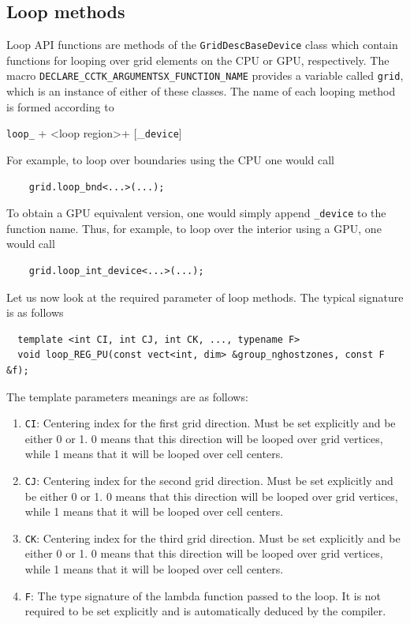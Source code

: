 
\subsection{Loop methods}
\label{sec:loop_methods}

Loop API functions are methods of the \texttt{GridDescBaseDevice} class which contain functions for looping over grid elements on the CPU or GPU, respectively. The macro \texttt{DECLARE\_CCTK\_ARGUMENTSX\_FUNCTION\_NAME} provides a variable called \texttt{grid}, which is an instance of either of these classes. The name of each looping method is formed according to
%
\begin{center}
    \texttt{loop\_} + \textless loop region\textgreater + [\_\texttt{device}]
\end{center}

For example, to loop over boundaries using the CPU one would call
%
\begin{lstlisting}
    grid.loop_bnd<...>(...);
\end{lstlisting}
%
To obtain a GPU equivalent version, one would simply append \texttt{\_device} to the function name. Thus, for example, to loop over the interior using a GPU, one would call 

\begin{lstlisting}
    grid.loop_int_device<...>(...);
\end{lstlisting}

Let us now look at the required parameter of loop methods. The typical signature is as follows

\begin{lstlisting}
  template <int CI, int CJ, int CK, ..., typename F>
  void loop_REG_PU(const vect<int, dim> &group_nghostzones, const F &f);
\end{lstlisting}

The template parameters meanings are as follows:

\begin{enumerate}
  \item \texttt{CI}: Centering index for the first grid direction. Must be set explicitly and be either 0 or 1. 0 means that this direction will be looped over grid vertices, while 1 means that it will be looped over cell centers.
  \item \texttt{CJ}: Centering index for the second grid direction. Must be set explicitly and be either 0 or 1. 0 means that this direction will be looped over grid vertices, while 1 means that it will be looped over cell centers.
  \item \texttt{CK}: Centering index for the third grid direction. Must be set explicitly and be either 0 or 1. 0 means that this direction will be looped over grid vertices, while 1 means that it will be looped over cell centers.
  \item \texttt{F}: The type signature of the lambda function passed to the loop. It is not required to be set explicitly and is automatically deduced by the compiler.
\end{enumerate}

